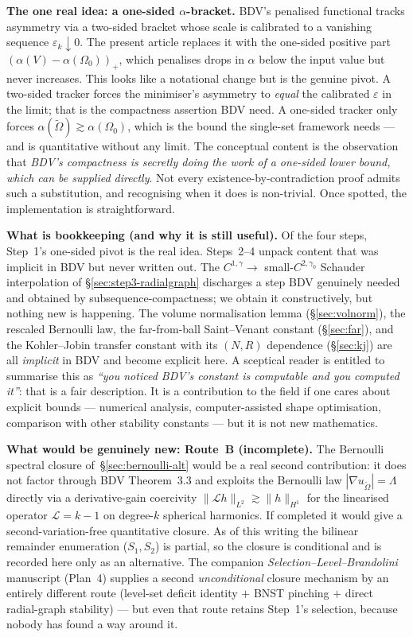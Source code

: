 \documentclass[11pt]{amsart}
\theoremstyle{definition}
\newcommand{\Otil}{\widetilde\Omega}
\begin{document}
\smallskip
\noindent\textbf{The one real idea: a one-sided $\alpha$-bracket.}
BDV's penalised functional tracks asymmetry via a two-sided bracket
whose scale is calibrated to a vanishing sequence
$\varepsilon_k\downarrow 0$.  The present article replaces it with
the one-sided positive part $(\alpha(V)-\alpha(\Omega_0))_+$, which
penalises drops in $\alpha$ below the input value but never
increases.  This looks like a notational change but is the genuine
pivot.  A two-sided tracker forces the minimiser's asymmetry to
\emph{equal} the calibrated $\varepsilon$ in the limit; that is the
compactness assertion BDV need.  A one-sided tracker only forces
$\alpha(\widetilde\Omega)\gtrsim\alpha(\Omega_0)$, which is the bound
the single-set framework needs --- and is quantitative without any
limit.  The conceptual content is the observation that \emph{BDV's
compactness is secretly doing the work of a one-sided lower bound,
which can be supplied directly}.  Not every
existence-by-contradiction proof admits such a substitution, and
recognising when it does is non-trivial.  Once spotted, the
implementation is straightforward.

\smallskip
\noindent\textbf{What is bookkeeping (and why it is still useful).}
Of the four steps, Step~1's one-sided pivot is the real idea.
Steps~2--4 unpack content that was implicit in BDV but never written
out.  The $C^{1,\gamma}\!\to\!$ small-$C^{2,\gamma_0}$ Schauder
interpolation of \S\ref{sec:step3-radialgraph} discharges a step BDV
genuinely needed and obtained by subsequence-compactness; we obtain
it constructively, but nothing new is happening.  The volume
normalisation lemma (\S\ref{sec:volnorm}), the rescaled Bernoulli
law, the far-from-ball Saint--Venant constant (\S\ref{sec:far}), and
the Kohler--Jobin transfer constant with its $(N,R)$ dependence
(\S\ref{sec:kj}) are all \emph{implicit} in BDV and become explicit
here.  A sceptical reader is entitled to summarise this as
\emph{``you noticed BDV's constant is computable and you computed
it''}: that is a fair description.  It is a contribution to the
field if one cares about explicit bounds --- numerical analysis,
computer-assisted shape optimisation, comparison with other
stability constants --- but it is not new mathematics.

\smallskip
\noindent\textbf{What would be genuinely new: Route~B (incomplete).}
The Bernoulli spectral closure
of~\S\ref{sec:bernoulli-alt} would be a real second contribution: it
does not factor through BDV Theorem~3.3 and exploits the Bernoulli
law $|\nabla u_{\Otil}|=\Lambda$ directly via a derivative-gain
coercivity $\|\mathcal Lh\|_{L^2}\gtrsim\|h\|_{H^1}$ for the
linearised operator $\mathcal L=k-1$ on degree-$k$ spherical harmonics.
If completed it would give a second-variation-free quantitative
closure.  As of this writing the bilinear remainder enumeration
($S_1,S_2$) is partial, so the closure is conditional and is
recorded here only as an alternative.  The companion
\emph{Selection--Level--Brandolini} manuscript (Plan~4) supplies a
second \emph{unconditional} closure mechanism by an entirely
different route (level-set deficit identity $+$ BNST pinching $+$
direct radial-graph stability) --- but even that route retains
Step~1's selection, because nobody has found a way around it.
\end{document}
